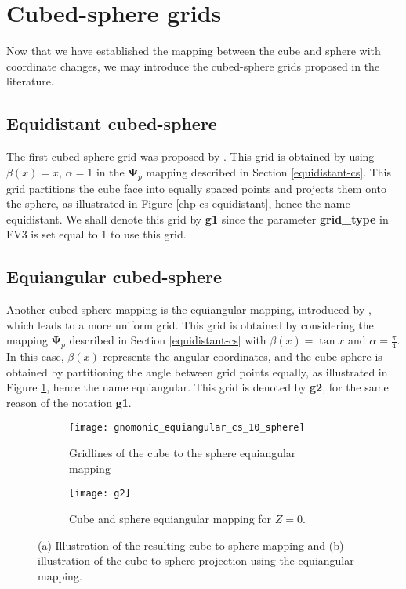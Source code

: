 \newpage
\section{Cubed-sphere grids}
\label{sec-cs-grids}
Now that we have established the mapping between the cube and sphere with coordinate changes,
we may introduce the cubed-sphere grids proposed in the literature.

\subsection{Equidistant cubed-sphere}
\label{cs-equidistant}
The first cubed-sphere grid was proposed by \citet{sadourny:1972}. This grid is obtained by using
$\beta(x) = x$, $\alpha=1$ in the $\boldsymbol{\Psi}_p$ mapping described in Section \ref{equidistant-cs}.
This grid partitions the cube face into equally spaced points
and projects them onto the sphere, as illustrated in Figure
\ref{chp-cs-equidistant}, hence the name equidistant.
We shall denote this grid by \textbf{g1} since the parameter
\textbf{grid\_type} in FV3 is set equal to 1 to use this grid.

\subsection{Equiangular cubed-sphere}
\label{cs-equiangular}
Another cubed-sphere mapping is the equiangular mapping, 
introduced by \citet{ronchi:1996}, which leads to a more uniform grid.
This grid is obtained by considering the mapping $\boldsymbol{\Psi}_p$ described in Section \ref{equidistant-cs}
with $\beta(x) = \tan{x}$ and $\alpha=\frac{\pi}{4}$.
In this case, $\beta(x)$ represents the angular coordinates, and the cube-sphere is obtained by partitioning the angle between
grid points equally, as illustrated in Figure \ref{chp-cs-equiangular}, hence the name equiangular.
This grid is denoted by \textbf{g2}, for the same reason of the notation \textbf{g1}.
\begin{figure}[!htb]
	\centering
	\begin{subfigure}{0.42\textwidth}
		\texttt{[image: gnomonic\_equiangular\_cs\_10\_sphere]}
		\caption{Gridlines of the cube to the sphere equiangular mapping}
	\end{subfigure}
	\begin{subfigure}{0.42\textwidth}
		\centering
		\texttt{[image: g2]}
		\caption{Cube and sphere equiangular mapping for $Z=0$.}
	\end{subfigure}
	\caption{(a) Illustration of the resulting cube-to-sphere mapping and (b) illustration of the cube-to-sphere projection using the equiangular mapping.\label{chp-cs-equiangular}}
\end{figure}

